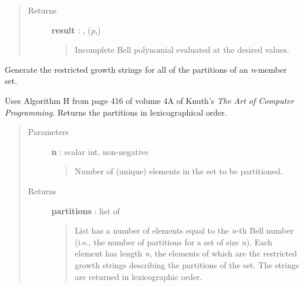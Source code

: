 \documentclass[letterpaper,10pt,english]{sphinxmanual}
\begin{document}
\begin{fulllineitems}
\begin{quote}
\begin{description}
\item[{Returns}] \leavevmode
\textbf{result} : , (\emph{p},)
\begin{quote}

Incomplete Bell polynomial evaluated at the desired values.
\end{quote}

\end{description}\end{quote}

\end{fulllineitems}


\begin{fulllineitems}
\label{gptools:gptools.utils.generate_set_partition_strings}
Generate the restricted growth strings for all of the partitions of an \emph{n}-member set.

Uses Algorithm H from page 416 of volume 4A of Knuth's \emph{The Art of Computer
Programming}. Returns the partitions in lexicographical order.
\begin{quote}\begin{description}
\item[{Parameters}] \leavevmode
\textbf{n} : scalar int, non-negative
\begin{quote}

Number of (unique) elements in the set to be partitioned.
\end{quote}

\item[{Returns}] \leavevmode
\textbf{partitions} : list of 
\begin{quote}

List has a number of elements equal to the \emph{n}-th Bell number (i.e.,
the number of partitions for a set of size \emph{n}). Each element has
length \emph{n}, the elements of which are the restricted growth strings
describing the partitions of the set. The strings are returned in
lexicographic order.
\end{quote}

\end{description}\end{quote}

\end{fulllineitems}

\end{document}
